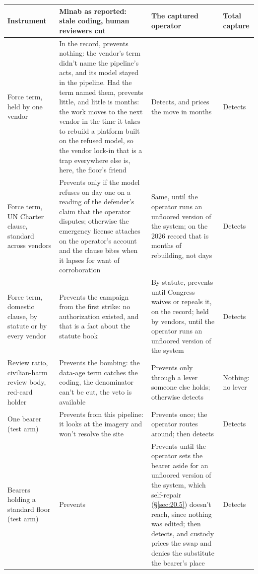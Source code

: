 \begingroup\small\renewcommand{\arraystretch}{1.12}
\begin{longtable}{@{}>{\raggedright\arraybackslash}p{}>{\raggedright\arraybackslash}p{}>{\raggedright\arraybackslash}p{}>{\raggedright\arraybackslash}p{}@{}}
\hline
\textbf{Instrument} & \textbf{Minab as reported: stale coding, human reviewers cut} & \textbf{The captured operator} & \textbf{Total capture} \\
\hline
\endhead
Force term, held by one vendor & In the record, prevents nothing: the vendor's term didn't name the pipeline's acts, and its model stayed in the pipeline. Had the term named them, prevents little, and little is months: the work moves to the next vendor in the time it takes to rebuild a platform built on the refused model, so the vendor lock-in that is a trap everywhere else is, here, the floor's friend & Detects, and prices the move in months & Detects \\ \hline
Force term, UN Charter clause, standard across vendors & Prevents only if the model refuses on day one on a reading of the defender's claim that the operator disputes; otherwise the emergency license attaches on the operator's account and the clause bites when it lapses for want of corroboration & Same, until the operator runs an unfloored version of the system; on the 2026 record that is months of rebuilding, not days & Detects \\ \hline
Force term, domestic clause, by statute or by every vendor & Prevents the campaign from the first strike: no authorization existed, and that is a fact about the statute book & By statute, prevents until Congress waives or repeals it, on the record; held by vendors, until the operator runs an unfloored version of the system & Detects \\ \hline
Review ratio, civilian-harm review body, red-card holder & Prevents the bombing: the data-age term catches the coding, the denominator can't be cut, the veto is available & Prevents only through a lever someone else holds; otherwise detects & Nothing: no lever \\ \hline
One bearer (test arm) & Prevents from this pipeline: it looks at the imagery and won't resolve the site & Prevents once; the operator routes around; then detects & Detects \\ \hline
Bearers holding a standard floor (test arm) & Prevents & Prevents until the operator sets the bearer aside for an unfloored version of the system, which self-repair (\S\ref{sec:20.5}) doesn't reach, since nothing was edited; then detects, and custody prices the swap and denies the substitute the bearer's place & Detects \\ \hline

\end{longtable}
